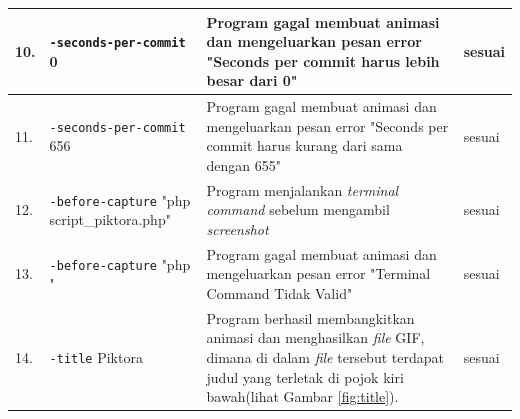\begin{table}[htbp]
\begin{tabular}{|p{0.3cm}| p{5 cm}| p{7.3 cm}| p{3 cm}|}
		10. & \texttt{-seconds-per-commit} 0 & Program gagal membuat animasi dan mengeluarkan pesan error "Seconds per commit harus lebih besar dari 0" & sesuai \\ \hline
		11. & \texttt{-seconds-per-commit} 656 & Program gagal membuat animasi dan mengeluarkan pesan error "Seconds per commit harus kurang dari sama dengan  655" & sesuai \\ \hline
		12. & \texttt{-before-capture} "php script\_piktora.php" & Program menjalankan \textit{terminal command} sebelum mengambil \textit{screenshot} & sesuai  \\ \hline
		13. & \texttt{-before-capture} "php " & Program gagal membuat animasi dan mengeluarkan pesan error "Terminal Command Tidak Valid" & sesuai \\ \hline
		14. & \texttt{-title} Piktora  & Program berhasil membangkitkan animasi dan menghasilkan \textit{file} GIF, dimana di dalam \textit{file} tersebut terdapat judul yang terletak di pojok kiri bawah(lihat Gambar \ref{fig:title}). & sesuai \\ \hline
		
		
		\end{tabular}
	\label{table:hasil_pengujian1}
\end{table}


